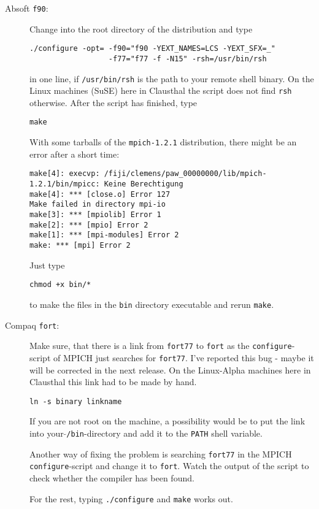 \documentclass[a4paper,10pt]{article}
\begin{document}
\begin{description}
\item[Absoft \texttt{f90}:] Change into the root directory of the distribution and type
\begin{verbatim}
./configure -opt= -f90="f90 -YEXT_NAMES=LCS -YEXT_SFX=_" 
                  -f77="f77 -f -N15" -rsh=/usr/bin/rsh 
\end{verbatim}
in one line, if \texttt{/usr/bin/rsh} is the path to your remote shell binary.
On the Linux machines (SuSE) here in Clausthal the script does not find
\texttt{rsh} otherwise.  After the script has finished, type
\begin{verbatim}
make
\end{verbatim}
 With some tarballs of the \texttt{mpich-1.2.1} distribution, there might be an
error after a short time: {\footnotesize
\begin{verbatim}
make[4]: execvp: /fiji/clemens/paw_00000000/lib/mpich-1.2.1/bin/mpicc: Keine Berechtigung 
make[4]: *** [close.o] Error 127 
Make failed in directory mpi-io
make[3]: *** [mpiolib] Error 1 
make[2]: *** [mpio] Error 2 
make[1]: *** [mpi-modules] Error 2 
make: *** [mpi] Error 2
\end{verbatim}
}
Just type
\begin{verbatim}
chmod +x bin/*
\end{verbatim}
to make the files in the \texttt{bin} directory executable and rerun \texttt{make}.
\item[Compaq \texttt{fort}:] Make sure, that there is a link from
\texttt{fort77} to \texttt{fort} as the \texttt{configure}-script of MPICH just
searches for \texttt{fort77}.  I've reported this bug - maybe it will be
corrected in the next release.  On the Linux-Alpha machines here in Clausthal
this link had to be made by hand.
\begin{verbatim}
ln -s binary linkname
\end{verbatim}
If you are not root on the machine, a possibility would be to put the link into
 your \texttt{$\tilde{}$/bin}-directory and add it to the \texttt{PATH} shell variable.  

Another way of fixing the problem is searching \texttt{fort77} in the MPICH
\texttt{configure}-script and change it to \texttt{fort}.  Watch the output of
the script to check whether the compiler has been found.

For the rest, typing \texttt{./configure} and \texttt{make} works out.

\end{description}
\end{document}
